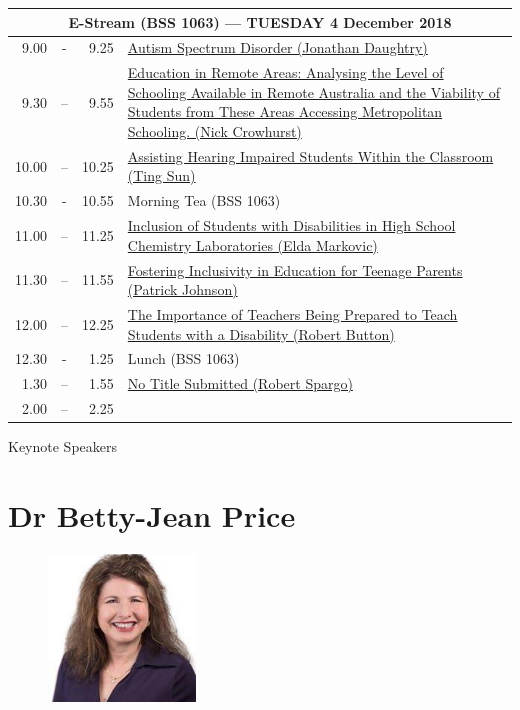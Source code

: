 \documentclass[twoside,12pt,a4paper,notitlepage]{memoir}
\begin{document}
\begin{center}
\begin{tabular}{rcr|p{10.8cm}}
 \multicolumn{4}{c}{{\large E-Stream (BSS 1063) --- TUESDAY 4 December 2018}} \\ \hline
9.00 & - & 9.25 &
 \hyperref[aut:daughtry]{Autism Spectrum Disorder (Jonathan Daughtry)} \\ \hline
9.30 & – & 9.55 &
 \hyperref[aut:crowhurst]{Education in Remote Areas: Analysing the Level of Schooling Available in Remote Australia and the Viability of Students from These Areas Accessing Metropolitan Schooling. (Nick Crowhurst)} \\ \hline
10.00 & – & 10.25 &
\hyperref[aut:sun]{Assisting Hearing Impaired Students Within the Classroom (Ting Sun)} \\ \hline
10.30 & - & 10.55 & Morning Tea (BSS 1063) \\ \hline
11.00 & – & 11.25 & 
 \hyperref[aut:markovic]{Inclusion of Students with Disabilities in High School Chemistry Laboratories (Elda Markovic)} \\ \hline
11.30 & – & 11.55 &
 \hyperref[aut:johnson]{Fostering Inclusivity in Education for Teenage Parents (Patrick Johnson)} \\ \hline
12.00 & – & 12.25 &
 \hyperref[aut:button]{The Importance of Teachers Being Prepared to Teach Students with a Disability
 (Robert Button)} \\ \hline
12.30 & - & 1.25 & Lunch (BSS 1063) \\ \hline
1.30 & – & 1.55 &
 \hyperref[aut:spargo]{No Title Submitted (Robert Spargo)} \\ \hline
2.00 & – & 2.25 & \\ \hline
\end{tabular}
\end{center}


% 



\clearpage{}
\vspace*{2cm}
{\Huge Keynote Speakers}
\vspace{2cm}

\section*{Dr Betty-Jean Price}

\begin{figure}
\centering
\includegraphics[width=0.35\textwidth]{betty_jean.jpg}
\end{figure}
\end{document}
